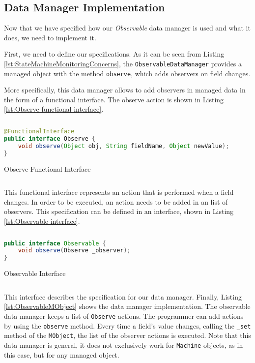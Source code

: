 \subsection{Data Manager Implementation}
Now that we have specified how our \textit{Observable} data manager is used and what it does, we need to implement it.

First, we need to define our specifications.
As it can be seen from Listing \ref{lst:StateMachineMonitoringConcerns}, the \texttt{ObservableDataManager} provides a managed object with the method \texttt{observe}, which adds observers on field changes.

More specifically, this data manager allows to add observers in managed data in the form of a functional interface.
The observe action is shown in Listing \ref{lst:Observe functional interface}.

\begin{sourcecode} [H]
	\begin{lstlisting}[language=Java, escapechar=|]
@FunctionalInterface
public interface Observe {
	void observe(Object obj, String fieldName, Object newValue);
}
	\end{lstlisting}
	\caption{Observe Functional Interface}
	\label{lst:Observe functional interface}
\end{sourcecode}

This functional interface represents an action that is performed when a field changes.
In order to be executed, an action needs to be added in an list of observers.
This specification can be defined in an interface, shown in Listing \ref{lst:Observable interface}.

\begin{sourcecode} [H]
	\begin{lstlisting}[language=Java, escapechar=|]
public interface Observable {
	void observe(Observe _observer);
}
	\end{lstlisting}
	\caption{Observable Interface}
	\label{lst:Observable interface}
\end{sourcecode}

This interface describes the specification for our data manager.
Finally, Listing \ref{lst:ObservableMObject} shows the data manager implementation.
The observable data manager keeps a list of \texttt{Observe} actions.
The programmer can add actions by using the \texttt{observe} method.
Every time a field's value changes, calling the \texttt{\_set} method of the \texttt{MObject}, the list of the observer actions is executed.
Note that this data manager is general, it does not exclusively work for \texttt{Machine} objects, as in this case, but for any managed object.

